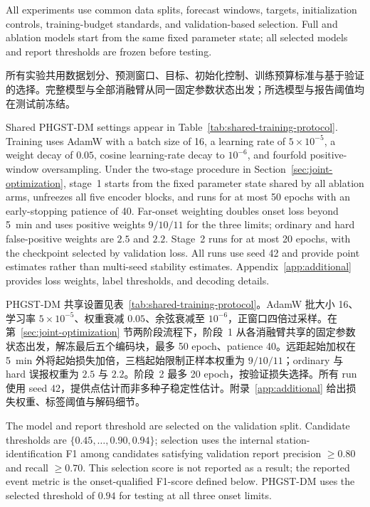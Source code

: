 \documentclass[a4paper,fleqn]{cas-dc}
\newcommand{\zhpara}[1]{%
  \par\begingroup\small\color{black!72}\noindent #1\par\endgroup}
\begin{document}
All experiments use common data splits, forecast windows, targets, initialization controls, training-budget standards, and validation-based selection. Full and ablation models start from the same fixed parameter state; all selected models and report thresholds are frozen before testing.

\zhpara{所有实验共用数据划分、预测窗口、目标、初始化控制、训练预算标准与基于验证的选择。完整模型与全部消融臂从同一固定参数状态出发；所选模型与报告阈值均在测试前冻结。}



Shared PHGST-DM settings appear in Table~\ref{tab:shared-training-protocol}. Training uses AdamW with a batch size of 16, a learning rate of $5\times10^{-5}$, a weight decay of $0.05$, cosine learning-rate decay to $10^{-6}$, and fourfold positive-window oversampling. Under the two-stage procedure in Section~\ref{sec:joint-optimization}, stage~1 starts from the fixed parameter state shared by all ablation arms, unfreezes all five encoder blocks, and runs for at most 50 epochs with an early-stopping patience of 40. Far-onset weighting doubles onset loss beyond 5~min and uses positive weights $9/10/11$ for the three limits; ordinary and hard false-positive weights are $2.5$ and $2.2$. Stage~2 runs for at most 20 epochs, with the checkpoint selected by validation loss. All runs use seed 42 and provide point estimates rather than multi-seed stability estimates. Appendix~\ref{app:additional} provides loss weights, label thresholds, and decoding details.

\zhpara{PHGST-DM 共享设置见表~\ref{tab:shared-training-protocol}。AdamW 批大小 16、学习率 $5\times10^{-5}$、权重衰减 $0.05$、余弦衰减至 $10^{-6}$，正窗口四倍过采样。在第~\ref{sec:joint-optimization} 节两阶段流程下，阶段~1 从各消融臂共享的固定参数状态出发，解冻最后五个编码块，最多 50 epoch、patience 40。远距起始加权在 5~min 外将起始损失加倍，三档起始限制正样本权重为 $9/10/11$；ordinary 与 hard 误报权重为 $2.5$ 与 $2.2$。阶段~2 最多 20 epoch，按验证损失选择。所有 run 使用 seed 42，提供点估计而非多种子稳定性估计。附录~\ref{app:additional} 给出损失权重、标签阈值与解码细节。}


The model and report threshold are selected on the validation split. Candidate thresholds are $\{0.45,\dots,0.90,0.94\}$; selection uses the internal station-identification F1 among candidates satisfying validation report precision $\geq0.80$ and recall $\geq0.70$. This selection score is not reported as a result; the reported event metric is the onset-qualified F1-score defined below. PHGST-DM uses the selected threshold of $0.94$ for testing at all three onset limits.
\end{document}
